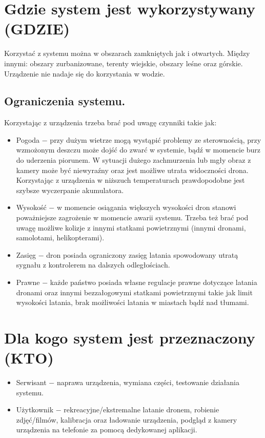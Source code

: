 \documentclass[12pt]{article}
\begin{document}
\section{Gdzie system jest wykorzystywany (GDZIE)}
Korzystać z systemu można w obszarach zamkniętych jak i otwartych. Między innymi: obszary zurbanizowane, terenty wiejskie, obszary leśne oraz górskie. Urządzenie nie nadaje się do korzystania w wodzie. 

\subsection{Ograniczenia systemu.}
Korzystając z urządzenia trzeba brać pod uwagę czynniki takie jak: 
\begin{itemize}
    \item Pogoda $-$ przy dużym wietrze mogą wystąpić problemy ze sterownością, przy wzmożonym deszczu może dojść do zwarć w systemie, bądź w momencie burz do uderzenia piorunem. W sytuacji dużego zachmurzenia lub mgły obraz z kamery może być niewyraźny oraz jest możliwe utrata widoczności drona. Korzystając z urządzenia w niższuch temperaturach prawdopodobne jest szybsze wyczerpanie akumulatora. 
    \item Wysokość $-$ w momencie osiągania większych wysokości dron stanowi poważniejsze zagrożenie w momencie awarii systemu. Trzeba też brać pod uwagę możliwe kolizje z innymi statkami powietrznymi (innymi dronami, samolotami, helikopterami).
    \item Zasięg $-$ dron posiada ograniczony zasięg latania spowodowany utratą sygnału z kontrolerem na dalszych odległościach.
    \item Prawne $-$ każde państwo posiada własne regulacje prawne dotyczące latania dronami oraz innymi bezzałogowymi statkami powietrznymi takie jak limit wysokości latania, brak możliwości latania w miastach bądź nad tłumami.
\end{itemize}

\section{Dla kogo system jest przeznaczony (KTO)}
\begin{itemize}
    \item Serwisant $-$ naprawa urządzenia, wymiana części, testowanie działania systemu.
    \item Użytkownik $-$ rekreacyjne/ekstremalne latanie dronem, robienie zdjęć/filmów, kalibracja oraz ładowanie urządzenia, podgląd z kamery urządzenia na telefonie za pomocą dedykowanej aplikacji.  
\end{itemize}
\end{document}
